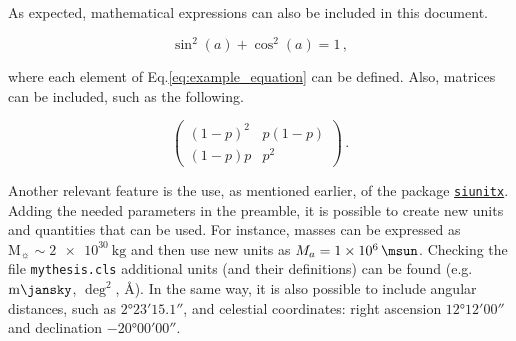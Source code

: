 As expected, mathematical expressions can also be included in this document.

\begin{equation}\label{eq:example_equation}
    \sin^2(a)+\cos^2(a) = 1\,,
\end{equation}

\noindent where each element of Eq.\ref{eq:example_equation} can be defined. Also, matrices can be included, such as the following.

\begin{equation}\label{eq:example_matrix}
    \begin{pmatrix}
      (1 - p)^{2} & p (1 - p)\\
      (1 - p) p   & p^{2}
    \end{pmatrix}\,.
\end{equation}

Another relevant feature is the use, as mentioned earlier, of the package \href{https://ctan.org/pkg/siunitx}{\texttt{siunitx}}. Adding the needed parameters in the preamble, it is possible to create new units and quantities that can be used. For instance, masses can be expressed as $\mathrm{M}_{\sun} \sim \qty{2e30}{\kg}$ and then use new units as $M_{a} = \qty{1e6}{\msun}$. Checking the file \texttt{mythesis.cls} additional units (and their definitions) can be found (e.g. $\unit{\milli\jansky}$, $\unit{\deg^{2}}$, $\unit{\angstrom}$). In the same way, it is also possible to include angular distances, such as $\ang[angle-symbol-over-decimal]{2;23;15.1}$, and celestial coordinates: right ascension $\ang[angle-symbol-degree=h, angle-symbol-minute=m, angle-symbol-second=s]{12;12;00}$ and declination $\ang{-20;00;00}$.